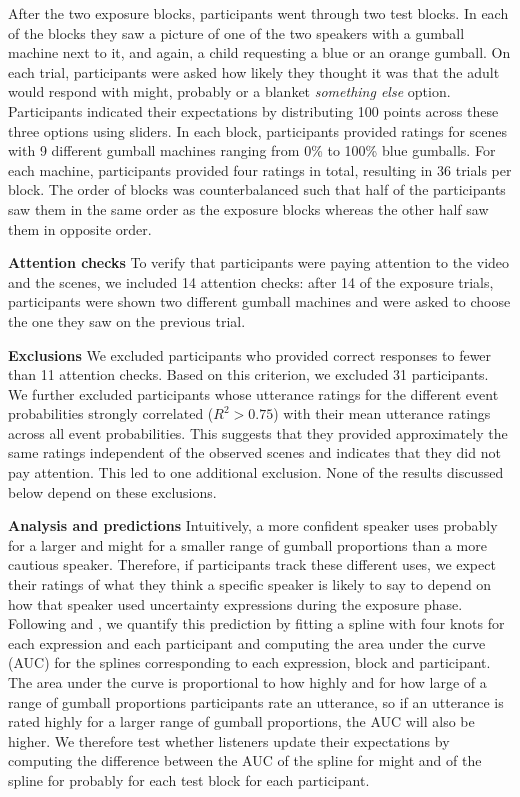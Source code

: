 \documentclass[10pt,letterpaper]{article}
\begin{document}
 After the two exposure blocks, participants went through two test blocks. In each of the blocks they saw a picture of one of the two speakers with a gumball machine next to it, and again, a child requesting a blue or an orange gumball. On each trial, participants were asked how likely they thought it was that the adult would respond with {\sc might}, {\sc probably} or a blanket \textit{something else} option. Participants indicated their expectations by distributing 100 points across these three options using sliders. In each block, participants provided ratings for scenes with 9 different gumball machines ranging from 0\% to 100\% blue gumballs. For each machine, participants provided four ratings in total, resulting in 36 trials per block. The order of blocks was counterbalanced such that half of the participants saw them in the same order as the exposure blocks whereas the other half saw them in opposite order.

\noindent \textbf{Attention checks}  To verify that participants were paying attention to the video and the scenes, we included 14 attention checks: after 14 of the exposure trials, participants were shown two different gumball machines and were asked to choose the one they saw on the previous trial. 

\noindent \textbf{Exclusions} We excluded participants who provided correct responses to fewer than 11 attention checks. Based on this criterion, we excluded 31 participants. We further excluded participants whose utterance ratings for the different event probabilities strongly correlated ($R^2 > 0.75$) with their mean utterance ratings across all event probabilities. This suggests that they provided approximately the same ratings independent of the observed scenes and indicates that they did not pay attention. This led to one additional exclusion. None of the results discussed below depend on these exclusions.

\noindent \textbf{Analysis and predictions} 
Intuitively, a more confident speaker uses {\sc probably} for a larger and {\sc might} 
for a smaller range of gumball proportions than a more cautious speaker. Therefore, 
if participants track these different uses, we expect their ratings of what they think 
a specific speaker is likely to say to depend on how that speaker used 
uncertainty expressions during the exposure phase. Following  and 
, we quantify this prediction by fitting a spline with four knots for each 
expression and each participant and computing the area under the curve (AUC) for the splines 
corresponding to each expression, block and participant. The area under the curve is proportional 
to how highly and for how large of a range of gumball proportions participants rate an utterance, so 
if an utterance is rated highly for a larger range of gumball proportions, the AUC will also be higher. 
We therefore test whether listeners update their expectations by computing the difference between 
the AUC of the spline for {\sc might} and of the spline for {\sc probably} for each test block for each 
participant. 
\end{document}
